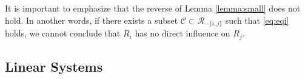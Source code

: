 \begin{remark}
It is important to emphasize that the reverse of Lemma \ref{lemma:small} does not hold. In another words, if there exists a subset $\mathcal{C}\subset\mathcal{R}_{-\{i,j\}}$ such that \eqref{eq:eqi} holds, we cannot conclude that $R_i$ has no direct influence on $R_j$.
\end{remark}



\subsection{Linear Systems}

